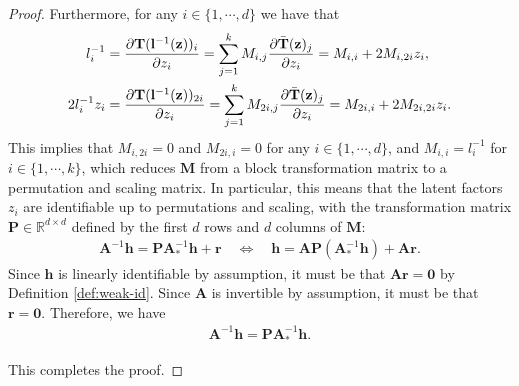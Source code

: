 \documentclass[10pt]{article} %
\theoremstyle{plain}
\theoremstyle{definition}
\begin{document}
\begin{proof}
    Furthermore, for any $i\in\{1,\cdots,d\}$ we have that
    \begin{align}
        l_i^{-1} &= \frac{\partial \mathbf{T}(\mathbf{l}^{-1}(\mathbf{z}))_i}{\partial z_i}=\sum_{j=1}^k M_{i,j}\frac{\partial \Bar{\mathbf{T}}(\mathbf{z})_j}{\partial z_i}=M_{i,i}+2M_{i,2i}z_i,\\
        2l_i^{-1}z_i &= \frac{\partial \mathbf{T}(\mathbf{l}^{-1}(\mathbf{z}))_{2i}}{\partial z_i}=\sum_{j=1}^k M_{2i,j}\frac{\partial \Bar{\mathbf{T}}(\mathbf{z})_j}{\partial z_i}=M_{2i,i}+2M_{2i,2i}z_i.
    \end{align}
    This implies that $M_{i,2i}=0$ and $M_{2i,i}=0$ for any $i\in\{1,\cdots,d\}$, and $M_{i,i}=l_i^{-1}$ for $i\in\{1,\cdots,k\}$, which reduces $\mathbf{M}$ from a block transformation matrix to a permutation and scaling matrix. In particular, this means that the latent factors $z_i$ are identifiable up to permutations and scaling, with the transformation matrix $\mathbf{P}\in\mathbb{R}^{d\times d}$ defined by the first $d$ rows and $d$ columns of $\mathbf{M}$:
    \begin{align}
        \mathbf{A}^{-1}\mathbf{h}=\mathbf{P}\mathbf{A}_*^{-1}\mathbf{h}+\mathbf{r}
        \quad\iff\quad 
        \mathbf{h}=\mathbf{A}\mathbf{P}(\mathbf{A}_*^{-1}\mathbf{h})+\mathbf{A}\mathbf{r}.
    \end{align}
    Since $\mathbf{h}$ is linearly identifiable by assumption, it must be that $\mathbf{A}\mathbf{r}=\mathbf{0}$ by Definition \ref{def:weak-id}. Since $\mathbf{A}$ is invertible by assumption, it must be that $\mathbf{r}=\mathbf{0}$. Therefore, we have
    \begin{align}
         \mathbf{A}^{-1}\mathbf{h}=\mathbf{P}\mathbf{A}_*^{-1}\mathbf{h}.
    \end{align}
    
    This completes the proof.
\end{proof}
\end{document}

